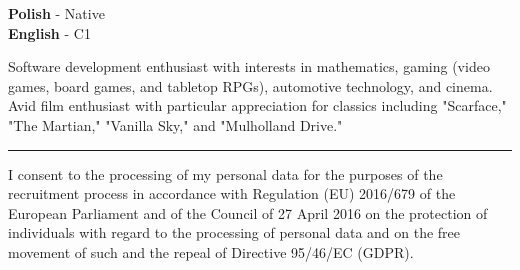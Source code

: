 \documentclass[9pt]{developercv}%
\begin{document}
	\vspace{0.5cm}


	\begin{minipage}[t]{0.3\textwidth}
		\vspace{-\baselineskip} %


		\textbf{Polish} - Native \\ \textbf{English} - C1
	\end{minipage}
	\hfill
	\begin{minipage}[t]{0.7\textwidth}
		\vspace{-\baselineskip} %


		Software development enthusiast with interests in mathematics, gaming (video
		games, board games, and tabletop RPGs), automotive technology, and cinema. Avid
		film enthusiast with particular appreciation for classics including "Scarface,"
		"The Martian," "Vanilla Sky," and "Mulholland Drive."
	\end{minipage}

	\vspace{1.5cm}

	\noindent
	\rule{8cm}{0.4pt}

	I consent to the processing of my personal data for the purposes of the recruitment
	process in accordance with Regulation (EU) 2016/679 of the European Parliament
	and of the Council of 27 April 2016 on the protection of individuals with regard
	to the processing of personal data and on the free movement of such and the repeal
	of Directive 95/46/EC (GDPR).
\end{document}
